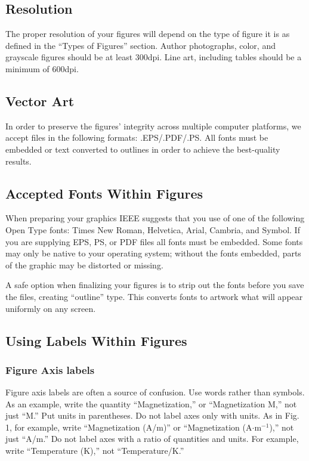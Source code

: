 \documentclass[journal]{IEEEtran}
\begin{document}
\subsection{Resolution }
The proper resolution of your figures will depend on the type of figure it 
is as defined in the ``Types of Figures'' section. Author photographs, 
color, and grayscale figures should be at least 300dpi. Line art, including 
tables should be a minimum of 600dpi.

\subsection{Vector Art}
In order to preserve the figures' integrity across multiple computer 
platforms, we accept files in the following formats: .EPS/.PDF/.PS. All 
fonts must be embedded or text converted to outlines in order to achieve the 
best-quality results.


\subsection{Accepted Fonts Within Figures}
When preparing your graphics IEEE suggests that you use of one of the 
following Open Type fonts: Times New Roman, Helvetica, Arial, Cambria, and 
Symbol. If you are supplying EPS, PS, or PDF files all fonts must be 
embedded. Some fonts may only be native to your operating system; without 
the fonts embedded, parts of the graphic may be distorted or missing.

A safe option when finalizing your figures is to strip out the fonts before 
you save the files, creating ``outline'' type. This converts fonts to 
artwork what will appear uniformly on any screen.

\subsection{Using Labels Within Figures}

\subsubsection{Figure Axis labels }
Figure axis labels are often a source of confusion. Use words rather than 
symbols. As an example, write the quantity ``Magnetization,'' or 
``Magnetization M,'' not just ``M.'' Put units in parentheses. Do not label 
axes only with units. As in Fig. 1, for example, write ``Magnetization 
(A/m)'' or ``Magnetization (A$\cdot$m$^{-1}$),'' not just ``A/m.'' Do not label axes with a ratio of quantities and 
units. For example, write ``Temperature (K),'' not ``Temperature/K.'' 
\end{document}
